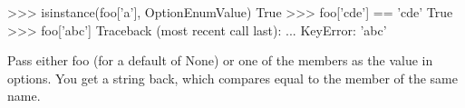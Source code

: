 \begin{python}
    >>> isinstance(foo['a'], OptionEnumValue)                                                                                                                                                                                     
    True                                                                                                                                                                                                                          
    >>> foo['cde'] == 'cde'                                                                                                                                                                                                       
    True                                                                                                                                                                                                                          
    >>> foo['abc']                                                                                                                                                                                                                
    Traceback (most recent call last):                                                                                                                                                                                            
    ...                                                                                                                                                                                                                           
    KeyError: 'abc'                                                                                                                                                                                                               
                                                                                                                                                                                                                                  
    Pass either foo (for a default of None) or one of the members                                                                                                                                                                 
    as the value in options{}. You get a string back, which compares                                                                                                                                                              
    equal to the member of the same name.                                                                                                                                                                                         
                                                                                                                                                                                                                                  

\end{python}
